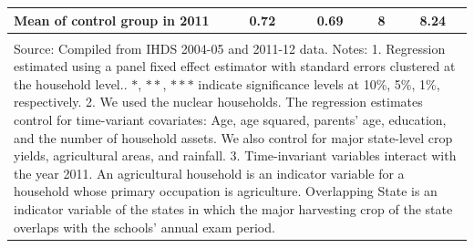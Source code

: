 \documentclass[12pt,letterpaper]{article}
\newcommand{\0}{\ensuremath{\mbox{\boldmath $0$}}}
\begin{document}
\begin{table}[h!]
\begin{center}
{{\begin{tabular}{lcccc}
Mean of control group in 2011          &       0.72 &       0.69 &          8 &       8.24 \\
\hline\\
\multicolumn{5}{p{20cm}}{{\footnotesize Source: Compiled from IHDS 2004-05 and 2011-12 data.
Notes: 1. Regression estimated using a panel fixed effect estimator with standard errors clustered at the household level.. $*$, $**$, $***$ indicate significance levels at 10\%, 5\%, 1\%, respectively.
2. We used the nuclear households. The regression estimates control for time-variant covariates: Age, age squared, parents’ age, education, and the number of household assets. We also control for major state-level crop yields, agricultural areas, and rainfall. 
3. Time-invariant variables interact with the year 2011. An agricultural household is an indicator variable for a household whose primary occupation is agriculture. Overlapping State is an indicator variable of the states in which the major harvesting crop of the state overlaps with the schools’ annual exam period. }}
\end{tabular}}}
\end{center}
\end{table}
\end{document}
